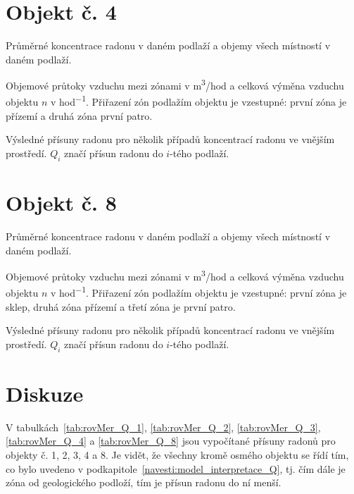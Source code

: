 \section{Objekt č. 4}
\begin{table}[H]
	\centering
	\caption{Průměrné koncentrace radonu v daném podlaží a objemy všech místností v daném podlaží.}
	
\end{table}
\begin{table}[H]
	\centering
    \caption{Objemové průtoky vzduchu mezi zónami v \si{m^3/hod} a celková výměna vzduchu objektu $n$ v \si{hod^{-1}}. Přiřazení zón podlažím objektu je vzestupné: první zóna je přízemí a druhá zóna první patro.}
	
\end{table}
\begin{table}[H]
	\centering
	\caption{Výsledné přísuny radonu pro několik případů koncentrací radonu ve vnějším prostředí. $Q_i$ značí přísun radonu do $i$-tého podlaží.}
    \label{tab:rovMer_Q_4}
	
\end{table}

\section{Objekt č. 8}
\begin{table}[H]
	\centering
	\caption{Průměrné koncentrace radonu v daném podlaží a objemy všech místností v daném podlaží.}
    \label{tab:rovMer_namereno_8}
	
\end{table}
\begin{table}[H]
	\centering
    \caption{Objemové průtoky vzduchu mezi zónami v \si{m^3/hod} a celková výměna vzduchu objektu $n$ v \si{hod^{-1}}. Přiřazení zón podlažím objektu je vzestupné: první zóna je sklep, druhá zóna přízemí a třetí zóna je první patro.}
    \label{tab:rovMer_prutoky_8}
	
\end{table}
\begin{table}[H]
	\centering
	\caption{Výsledné přísuny radonu pro několik případů koncentrací radonu ve vnějším prostředí. $Q_i$ značí přísun radonu do $i$-tého podlaží.}
    \label{tab:rovMer_Q_8}
	
\end{table}

\section{Diskuze}
V tabulkách~\ref{tab:rovMer_Q_1}, \ref{tab:rovMer_Q_2}, \ref{tab:rovMer_Q_3}, \ref{tab:rovMer_Q_4} a \ref{tab:rovMer_Q_8} jsou vypočítané přísuny radonů pro objekty č. 1, 2, 3, 4 a 8. Je vidět, že všechny kromě osmého objektu se řídí tím, co bylo uvedeno v podkapitole~\ref{navesti:model_interpretace_Q}, tj. čím dále je zóna od geologického podloží, tím je přísun radonu do ní menší. 

